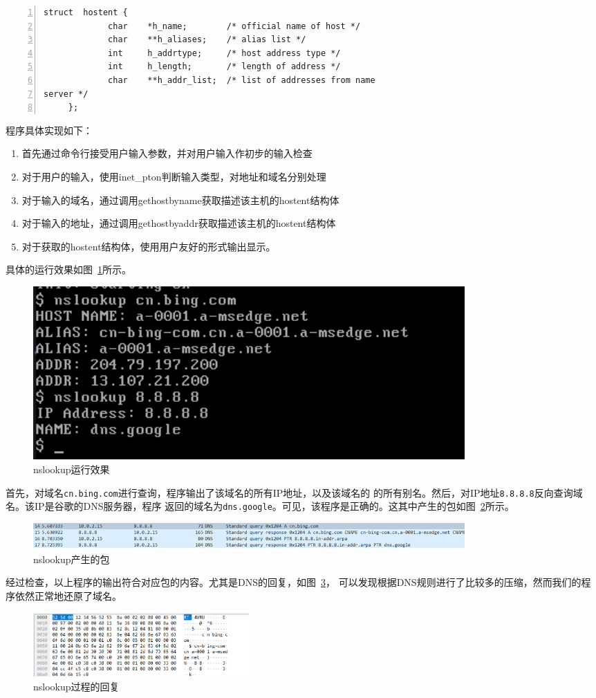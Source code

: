 \documentclass[a4paper,twoside]{ctexrep}
\begin{document}
\begin{spacing}{1.2}
\begin{lstlisting}[numbers=left,style=CppStyle,caption={hostent结构体定义},label={code:hostent}]
	struct  hostent { 
             char    *h_name;        /* official name of host */ 
             char    **h_aliases;    /* alias list */ 
             int     h_addrtype;     /* host address type */ 
             int     h_length;       /* length of address */ 
             char    **h_addr_list;  /* list of addresses from name 
server */ 
     }; 
\end{lstlisting}
   
程序具体实现如下：
\begin{enumerate}
	\item 首先通过命令行接受用户输入参数，并对用户输入作初步的输入检查
	\item 对于用户的输入，使用inet\_pton判断输入类型，对地址和域名分别处理
	\item 对于输入的域名，通过调用gethostbyname获取描述该主机的hostent结构体
	\item 对于输入的地址，通过调用gethostbyaddr获取描述该主机的hostent结构体
	\item 对于获取的hostent结构体，使用用户友好的形式输出显示。
\end{enumerate}

具体的运行效果如图~\ref{fig:nslookup}所示。
\begin{figure}[htb]
	\centering
	\caption{nslookup运行效果}
	\label{fig:nslookup}
	\includegraphics[width=0.8\textwidth]{nslookup.png}
\end{figure}
首先，对域名\texttt{cn.bing.com}进行查询，程序输出了该域名的所有IP地址，以及该域名的
的所有别名。然后，对IP地址\texttt{8.8.8.8}反向查询域名。该IP是谷歌的DNS服务器，程序
返回的域名为\texttt{dns.google}。可见，该程序是正确的。这其中产生的包如图~\ref{fig:nslookuppacket}所示。
\begin{figure}[htb]
	\centering
	\caption{nslookup产生的包}
	\label{fig:nslookuppacket}
	\includegraphics[width=0.8\textwidth]{nslookuppack.png}
\end{figure}
经过检查，以上程序的输出符合对应包的内容。尤其是DNS的回复，如图~\ref{fig:nslookuprep}，
可以发现根据DNS规则进行了比较多的压缩，然而我们的程序依然正常地还原了域名。
\begin{figure}[htb]
	\centering
	\caption{nslookup过程的回复}
	\label{fig:nslookuprep}
	\includegraphics[width=0.4\textwidth]{nslookupresppack.png}
\end{figure}


\end{spacing}
\end{document}
